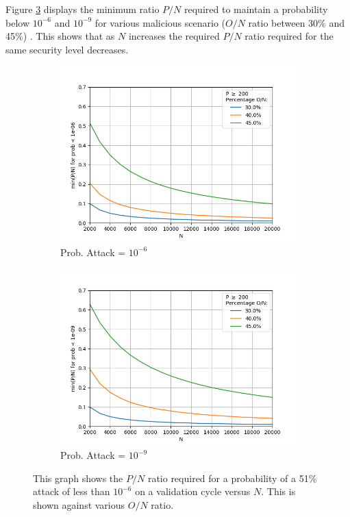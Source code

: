 Figure \ref{fig:threshV} displays the minimum ratio $P/N$ required to maintain a probability below $10^{-6}$ and $10^{-9}$ for various malicious scenario ($O/N$ ratio between 30\% and 45\%) . This shows that as $N$ increases the required $P/N$ ratio required for the same security level decreases. 

\begin{figure}[H]
	\centering
	\begin{subfigure}[b]{0.45\textwidth}
		\includegraphics[width=\textwidth]{Figures/PoN_vs_N_Thre_Prob51_10em6_O30_to_45}
		
		\renewcommand{\thesubfigure}{a}
		\caption{Prob. Attack = $10^{-6}$}
		\label{fig:N20-50}
	\end{subfigure}
	\begin{subfigure}[b]{0.45\textwidth}
		\includegraphics[width=\textwidth]{Figures/PoN_vs_N_Thre_Prob51_10em9_O30_to_45}
		
		\renewcommand{\thesubfigure}{b}
		\caption{Prob. Attack = $10^{-9}$}
		\label{fig:N50-100}
	\end{subfigure}
\caption{\label{fig:threshV} This graph shows the $P/N$ ratio required for a probability of a 51\% attack of less than $10^{-6}$ on a validation cycle versus $N$. This is shown against various $O/N$ ratio. }
\end{figure}

